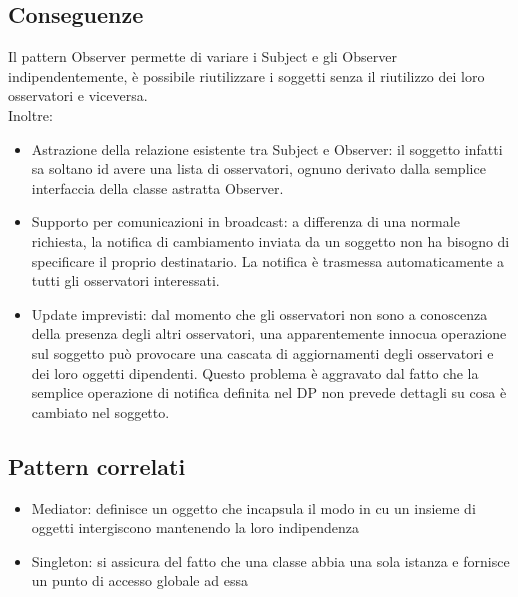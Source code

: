 \subsection*{Conseguenze}
Il pattern Observer permette di variare i Subject e gli Observer indipendentemente, è 
possibile riutilizzare i soggetti senza il riutilizzo dei loro osservatori e viceversa.\\
Inoltre: 
\begin{itemize}
    \item Astrazione della relazione esistente tra Subject e Observer: il soggetto infatti sa
    soltano id avere una lista di osservatori, ognuno derivato dalla semplice interfaccia della classe
    astratta Observer.
    \item Supporto per comunicazioni in broadcast: a differenza di una normale richiesta, la notifica
    di cambiamento inviata da un soggetto non ha bisogno di specificare il proprio destinatario.
    La notifica è trasmessa automaticamente a tutti gli osservatori interessati.
    \item Update imprevisti: dal momento che gli osservatori non sono a conoscenza della presenza
    degli altri osservatori, una apparentemente innocua operazione sul soggetto può provocare una
    cascata di aggiornamenti degli osservatori e dei loro oggetti dipendenti. Questo problema è aggravato
    dal fatto che la semplice operazione di notifica definita nel DP non prevede dettagli su
    cosa è cambiato nel soggetto.
\end{itemize}
\subsection*{Pattern correlati}
\begin{itemize}
    \item Mediator: definisce un oggetto che incapsula il modo in cu un insieme di oggetti
    intergiscono mantenendo la loro indipendenza
    \item Singleton: si assicura del fatto che una classe abbia una sola istanza e fornisce un
    punto di accesso globale ad essa
\end{itemize}
